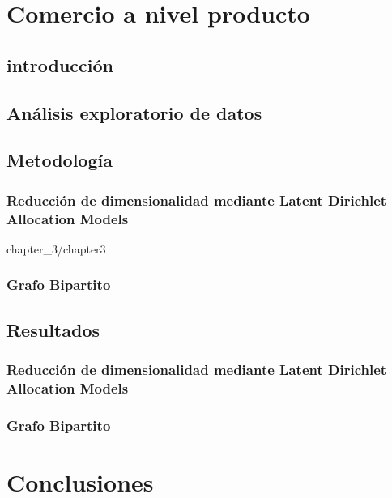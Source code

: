 \documentclass[11pt,a4paper]{tesis}
\begin{document}

\chapter{Comercio a nivel producto}





\section{introducción}


\section{Análisis exploratorio de datos}



\section{Metodología}

\subsection{Reducción de dimensionalidad mediante Latent Dirichlet Allocation Models}


{chapter_3/chapter3}


\subsection{Grafo Bipartito}

\section{Resultados}

\subsection{Reducción de dimensionalidad mediante Latent Dirichlet Allocation Models}

\subsection{Grafo Bipartito}


\chapter{Conclusiones}




\backmatter
%


%
\end{document}
